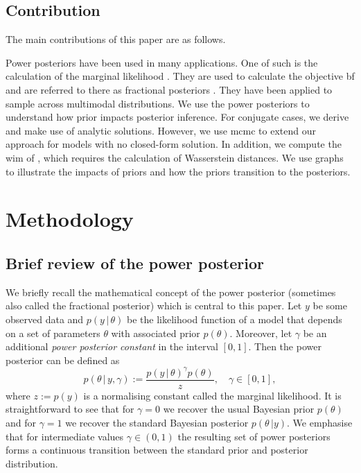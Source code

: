\documentclass[12pt]{article}
\begin{document}
\subsection{}

\subsection{Contribution}

The main contributions of this paper are as follows.

Power posteriors have been used in many applications. One of such is the
calculation of the marginal likelihood \citep{friel2008marginal}. They are used
to calculate the objective \gls{bf} and are referred to there as fractional
posteriors \citep{ohaganPropertiesIntrinsicFractional1997}. They have been
applied to sample across multimodal distributions. We use the power posteriors
to understand how prior impacts posterior inference. For conjugate cases, we
derive and make use of analytic solutions. However, we use \gls{mcmc} to extend
our approach for models with no closed-form solution. In addition, we compute
the \gls{wim} of \cite{ghaderinezhadWassersteinImpactMeasure2022}, which requires the calculation of Wasserstein distances. We use graphs to illustrate the impacts of priors and how the priors transition to the posteriors.
\section{Methodology}

\subsection{Brief review of the power posterior}
We briefly recall the mathematical concept of the power posterior (sometimes
also called the fractional posterior) which is central to this paper. Let $y$
be some observed data and $p(y\, | \, \theta)$ be the likelihood function of a
model that depends on a set of parameters $\theta$ with associated prior
$p(\theta)$. Moreover, let $\gamma$ be an additional \emph{power posterior
constant} in the interval $[0, 1]$. Then the power posterior
\citep{friel2008marginal} can be defined as
\begin{equation}
\label{eq:pow_pos}
p(\theta \, | \, y,\gamma) := \frac{p(y \, | \, \theta)^\gamma p(\theta)}{z}, \quad \gamma \in [0, 1],
\end{equation}
where $z := p(y)$ is a normalising constant called the marginal likelihood. It
is straightforward to see that for $\gamma = 0$ we recover the usual Bayesian
prior $p(\theta)$ and for $\gamma = 1$ we recover the standard Bayesian
posterior $p(\theta \, | y)$. We emphasise that for intermediate values $\gamma
\in (0, 1)$ the resulting set of power posteriors forms a continuous
transition between the standard prior and posterior distribution.
\end{document}
